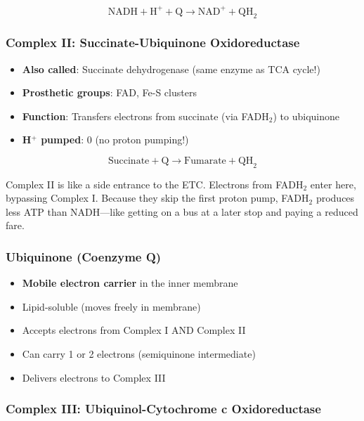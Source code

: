 \[
\text{NADH} + \text{H}^+ + \text{Q} \rightarrow \text{NAD}^+ + \text{QH}_2
\]

\subsubsection{Complex II: Succinate-Ubiquinone Oxidoreductase}

\begin{itemize}
    \item \textbf{Also called}: Succinate dehydrogenase (same enzyme as TCA cycle!)
    \item \textbf{Prosthetic groups}: FAD, Fe-S clusters
    \item \textbf{Function}: Transfers electrons from succinate (via FADH$_2$) to ubiquinone
    \item \textbf{H$^+$ pumped}: 0 (no proton pumping!)
\end{itemize}

\[
\text{Succinate} + \text{Q} \rightarrow \text{Fumarate} + \text{QH}_2
\]

\begin{analogy}
Complex II is like a side entrance to the ETC. Electrons from FADH$_2$ enter here, bypassing Complex I. Because they skip the first proton pump, FADH$_2$ produces less ATP than NADH—like getting on a bus at a later stop and paying a reduced fare.
\end{analogy}

\subsubsection{Ubiquinone (Coenzyme Q)}

\begin{itemize}
    \item \textbf{Mobile electron carrier} in the inner membrane
    \item Lipid-soluble (moves freely in membrane)
    \item Accepts electrons from Complex I AND Complex II
    \item Can carry 1 or 2 electrons (semiquinone intermediate)
    \item Delivers electrons to Complex III
\end{itemize}

\subsubsection{Complex III: Ubiquinol-Cytochrome c Oxidoreductase}

